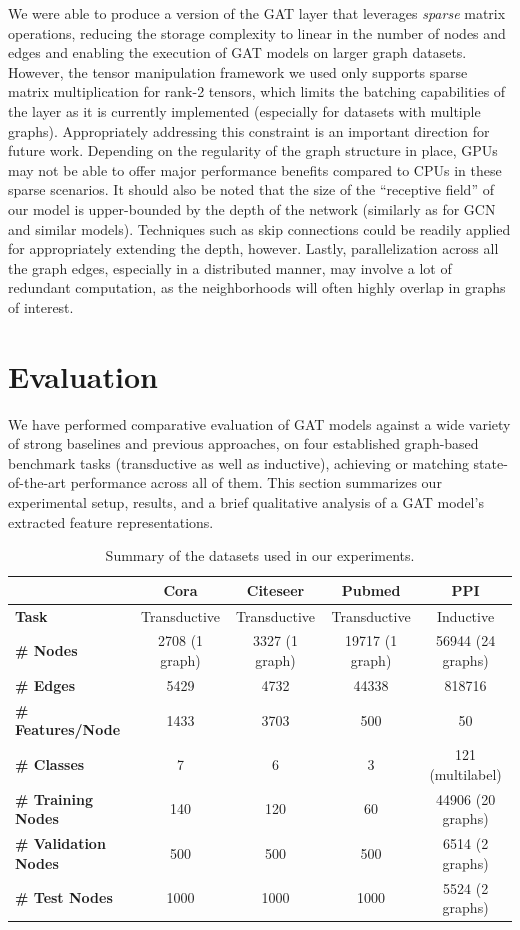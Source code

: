 \documentclass{article} %
\begin{document}
We were able to produce a version of the GAT layer that leverages \emph{sparse} matrix operations, reducing the storage complexity to linear in the number of nodes and edges and enabling the execution of GAT models on larger graph datasets. However, the tensor manipulation framework we used only supports sparse matrix multiplication for rank-2 tensors, which limits the batching capabilities of the layer as it is currently implemented (especially for datasets with multiple graphs). Appropriately addressing this constraint is an important direction for future work. Depending on the regularity of the graph structure in place, GPUs may not be able to offer major performance benefits compared to CPUs in these sparse scenarios. It should also be noted that the size of the ``receptive field'' of our model is upper-bounded by the depth of the network (similarly as for GCN and similar models). Techniques such as skip connections \citep{he2016deep} could be readily applied for appropriately extending the depth, however. Lastly, parallelization across all the graph edges, especially in a distributed manner, may involve a lot of redundant computation, as the neighborhoods will often highly overlap in graphs of interest.

\section{Evaluation}

We have performed comparative evaluation of GAT models against a wide variety of strong baselines and previous approaches, on four established graph-based benchmark tasks (transductive as well as inductive), achieving or matching state-of-the-art performance across all of them. This section summarizes our experimental setup, results, and a brief qualitative analysis of a GAT model's extracted feature representations.

\begin{table}
\caption{Summary of the datasets used in our experiments.}
\label{datasets}
\begin{center}
\begin{tabular}{l c c c c}
\toprule 
 & {\bf Cora} & {\bf Citeseer} & {\bf Pubmed} & {\bf PPI} \\ \midrule
{\bf Task} & Transductive & Transductive & Transductive & Inductive \\
{\bf \# Nodes} & 2708 (1 graph) & 3327 (1 graph) & 19717 (1 graph) & 56944 (24 graphs) \\
{\bf \# Edges} & 5429 & 4732 & 44338 & 818716\\
{\bf \# Features/Node} & 1433 & 3703 & 500 & 50 \\
{\bf \# Classes} & 7 & 6 & 3 & 121 (multilabel) \\
{\bf \# Training Nodes} & 140 & 120 & 60 & 44906 (20 graphs) \\
{\bf \# Validation Nodes} & 500 & 500 & 500 & 6514 (2 graphs) \\
{\bf \# Test Nodes} & 1000 & 1000 & 1000 & 5524 (2 graphs) \\
\bottomrule
\end{tabular}
\end{center}
\end{table}
\end{document}
